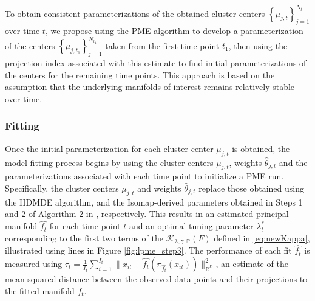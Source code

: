 \documentclass[12pt]{article}
\theoremstyle{definition}
\begin{document}
To obtain consistent parameterizations of the obtained cluster centers $\left\{\mu_{j, t}\right\}_{j=1}^{N_t}$ over time $t$, we propose using the PME algorithm to develop a parameterization of the centers $\left\{\mu_{j, t_1}\right\}_{j=1}^{N_{t_1}}$ taken from the first time point $t_1$, then using the projection index associated with this estimate to find initial parameterizations of the centers for the remaining time points. This approach is based on the assumption that the underlying manifolds of interest remains relatively stable over time.

\subsubsection{Fitting}

Once the initial parameterization for each cluster center $\mu_{j, t}$ is obtained, the model fitting process begins by using the cluster centers $\mu_{j, t}$, weights $\hat{\theta}_{j, t}$ and the parameterizations associated with each time point to initialize a PME run. Specifically, the cluster centers $\mu_{j, t}$ and weights $\hat{\theta}_{j, t}$ replace those obtained using the HDMDE algorithm, and the Isomap-derived parameters obtained in Steps 1 and 2 of Algorithm 2 in \cite{meng2021Principal}, respectively.
This results in an estimated principal manifold $\widehat{f_t}$ for each time point $t$ and an optimal tuning parameter $\lambda_t^*$ corresponding to the first two terms of the $\mathcal{K}_{\lambda, \gamma, \mathbb{P}}(F)$ defined in \eqref{eq:newKappa}, illustrated using lines in Figure \ref{fig:lpme_step3}. The performance of each fit $\widehat{f_t}$ is measured using $\tau_t = \frac{1}{I_t}\sum_{i=1}^{I_t}\| x_{it} - \widehat{f_t}(\pi_{\widehat{f_t}}(x_{it}))\|^{2}_{\mathbb{R}^D}$, an estimate of the mean squared distance between the observed data points and their projections to the fitted manifold $\widehat{f_t}$.
\end{document}
